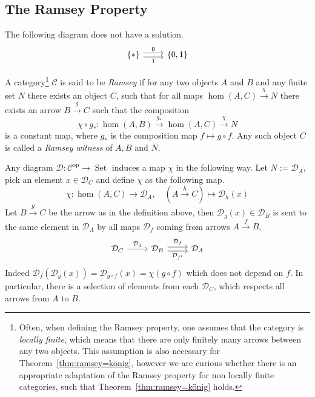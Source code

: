 \documentclass[preprint,12pt]{elsarticle}
\newcommand{\cat}[1]{\mathcal{#1}}
\newcommand{\op}{^{\mathop{op}}}
\DeclareMathOperator{\Set}{Set}
\begin{document}
\subsection{The Ramsey Property}
\begin{exam}
\label{exam:Ramsey}
The following diagram does not have a solution.
$$
\begin{tikzcd}
\{*\} \arrow[r, "0", shift left] \arrow[r, "1"', shift right] & {\{0,1\}}
\end{tikzcd}
$$
\end{exam}
 
\begin{defin}
\label{def:ramsey}
    A category\footnote{Often, when defining the Ramsey property, one assumes that the category is \emph{locally finite}, which means that there are only finitely many arrows between any two objects. This assumption is also necessary for Theorem~\ref{thm:ramsey=könig}, however we are curious whether there is an appropriate adaptation of the Ramsey property for non locally finite categories, such that Theorem~\ref{thm:ramsey=könig} holds.} 
    $\cat C$ is said to be \emph{Ramsey} if for any two objects $A$ and $B$ and any finite set $N$ there exists an object $C$, such that for all maps $\hom(A,C)\xrightarrow{\chi} N$ there exists an arrow $B\xrightarrow{g} C$ such that the composition
    $$
   \chi\circ g_*:\hom(A,B)\xrightarrow{g_*} \hom(A,C)\xrightarrow{\chi} N
    $$
    is a constant map, where $g_*$ is the composition map $f\mapsto g\circ f$. Any such object $C$ is called a \emph{Ramsey witness} of $A,B$ and $N$.
\end{defin}
 
\begin{exam}
\label{exam:ramseysey}
    Any diagram $\cat D:\cat C\op\to\Set$ induces a map $\chi$ in the following way. Let $N:=\cat D_A$, pick an element $x\in\cat D_C$ and define $\chi$ as the following map.
    $$
    \chi:\hom(A,C)\xrightarrow{}\cat D_A,\quad (A\xrightarrow{h}C)\mapsto\cat D_h(x)%
    $$
    Let $B\xrightarrow{g}C$ be the arrow as in the definition above, then $\cat D_g(x)\in\cat D_B$ is sent to the same element in $\cat D_A$ by all maps $\cat D_f$ coming from arrows $A\xrightarrow{f}B$.
$$
\begin{tikzcd}
\cat D_C \arrow[r, "\cat D_g"] & \cat D_B \arrow[r, "\cat D_{f'}"', shift right] \arrow[r, "\cat D_f", shift left] & \cat D_A
\end{tikzcd}
$$
Indeed $\cat D_f(\cat D_g(x)) = \cat D_{g\circ f}(x) = \chi(g\circ f)$ which does not depend on $f$. In particular, there is a selection of elements from each $\cat D_C$, which respects all arrows from $A$ to $B$.
\end{exam}
\end{document}
